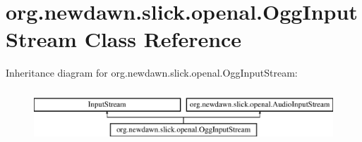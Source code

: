 \hypertarget{classorg_1_1newdawn_1_1slick_1_1openal_1_1_ogg_input_stream}{}\section{org.\+newdawn.\+slick.\+openal.\+Ogg\+Input\+Stream Class Reference}
\label{classorg_1_1newdawn_1_1slick_1_1openal_1_1_ogg_input_stream}
Inheritance diagram for org.\+newdawn.\+slick.\+openal.\+Ogg\+Input\+Stream\+:\begin{figure}[H]
\begin{center}
\leavevmode
\includegraphics[height=2.000000cm]{classorg_1_1newdawn_1_1slick_1_1openal_1_1_ogg_input_stream}
\end{center}
\end{figure}
